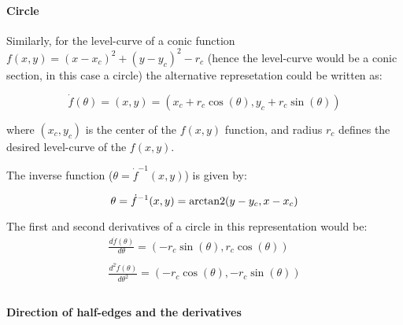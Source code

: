 \paragraph{Circle}
Similarly, for the level-curve of a conic function $f(x,y)=(x-x_c)^2+(y-y_c)^2-r_c$ (hence the level-curve would be a conic section, in this case a circle) the alternative represetation could be written as:

\[
\dot{f}(\theta) = (x,y) = \left( x_c + r_c \cos(\theta), y_c + r_c \sin(\theta) \right)
\]

where $(x_c,y_c)$ is the center of the $f(x,y)$ function, and radius $r_c$ defines the desired level-curve of the $f(x,y)$.\bigskip

The inverse function ($\theta = \dot{f}^{-1}(x,y)$) is given by:

\[
\theta = \dot{f}^{-1}(x,y) = \operatorname{arctan2} (y - y_c, x - x_c)
\]

The first and second derivatives of a circle in this representation would be:
\[
\begin{array}{l}
  \frac{d\dot{f}(\theta)}{d\theta} = \left( -r_c \sin(\theta), r_c \cos(\theta) \right)\\
  \quad\\
  \frac{d^2\dot{f}(\theta)}{d\theta^2} = \left( -r_c \cos(\theta), -r_c \sin(\theta) \right)\\
\end{array}
\]


\paragraph{Direction of half-edges and the derivatives}
